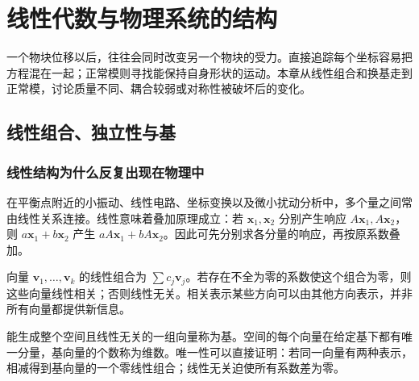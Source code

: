 \documentclass[11pt,openany,fontset=fandol]{ctexbook}
\theoremstyle{plain}\newtheorem{theorem}{定理}[chapter]\newtheorem{proposition}[theorem]{命题}
\theoremstyle{definition}\newtheorem{definition}{定义}[chapter]\newtheorem{example}{例}[chapter]
\theoremstyle{remark}\newtheorem*{remark}{说明}
\newcommand{\vct}[1]{\bm{#1}}\newcommand{\Rea}{\operatorname{Re}}\newcommand{\Ima}{\operatorname{Im}}
\begin{document}
\chapter{线性代数与物理系统的结构}
一个物块位移以后，往往会同时改变另一个物块的受力。直接追踪每个坐标容易把方程混在一起；正常模则寻找能保持自身形状的运动。本章从线性组合和换基走到正常模，讨论质量不同、耦合较弱或对称性被破坏后的变化。

\section{线性组合、独立性与基}
\subsection{线性结构为什么反复出现在物理中}
在平衡点附近的小振动、线性电路、坐标变换以及微小扰动分析中，多个量之间常由线性关系连接。线性意味着叠加原理成立：若 $\vct x_1,\vct x_2$ 分别产生响应 $A\vct x_1,A\vct x_2$，则 $a\vct x_1+b\vct x_2$ 产生 $aA\vct x_1+bA\vct x_2$。因此可先分别求各分量的响应，再按原系数叠加。

向量 $\vct v_1,\ldots,\vct v_k$ 的线性组合为 $\sum c_j\vct v_j$。若存在不全为零的系数使这个组合为零，则这些向量线性相关；否则线性无关。相关表示某些方向可以由其他方向表示，并非所有向量都提供新信息。

能生成整个空间且线性无关的一组向量称为基。空间的每个向量在给定基下都有唯一分量，基向量的个数称为维数。唯一性可以直接证明：若同一向量有两种表示，相减得到基向量的一个零线性组合；线性无关迫使所有系数差为零。
\end{document}
